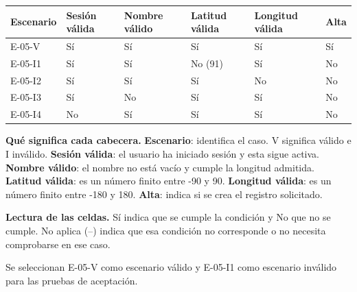 \begingroup\fontsize{7.8}{11}\selectfont\setlength{\tabcolsep}{3pt}
\begin{tabularx}{\linewidth}{@{}*{6}{Y}@{}}\toprule
\textbf{Escenario} & \textbf{Sesión válida} & \textbf{Nombre válido} & \textbf{Latitud válida} & \textbf{Longitud válida} & \textbf{Alta}\\\midrule
E-05-V & Sí & Sí & Sí & Sí & Sí\\[3pt]
E-05-I1 & Sí & Sí & No (91) & Sí & No\\[3pt]
E-05-I2 & Sí & Sí & Sí & No & No\\[3pt]
E-05-I3 & Sí & No & Sí & Sí & No\\[3pt]
E-05-I4 & No & Sí & Sí & Sí & No\\[3pt]
\bottomrule\end{tabularx}\endgroup\par
{\fontsize{9}{11}\selectfont\textbf{Qué significa cada cabecera.} \textbf{Escenario}: identifica el caso. V significa válido e I inválido. \textbf{Sesión válida}: el usuario ha iniciado sesión y esta sigue activa. \textbf{Nombre válido}: el nombre no está vacío y cumple la longitud admitida. \textbf{Latitud válida}: es un número finito entre -90 y 90. \textbf{Longitud válida}: es un número finito entre -180 y 180. \textbf{Alta}: indica si se crea el registro solicitado.\par\textbf{Lectura de las celdas.} Sí indica que se cumple la condición y No que no se cumple. No aplica (--) indica que esa condición no corresponde o no necesita comprobarse en ese caso.\par}


Se seleccionan E-05-V como escenario válido y E-05-I1 como escenario inválido para las pruebas de aceptación.\par


